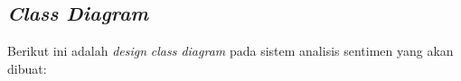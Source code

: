 \subsection{\textit{Class Diagram}}
Berikut ini adalah \textit{design} \textit{class diagram} pada sistem analisis sentimen yang akan dibuat:

	
\begin{adjustbox}{width=1\textwidth}
\noindent\begin{minipage}{\linewidth}
\end{minipage}
\end{adjustbox}
\newpage